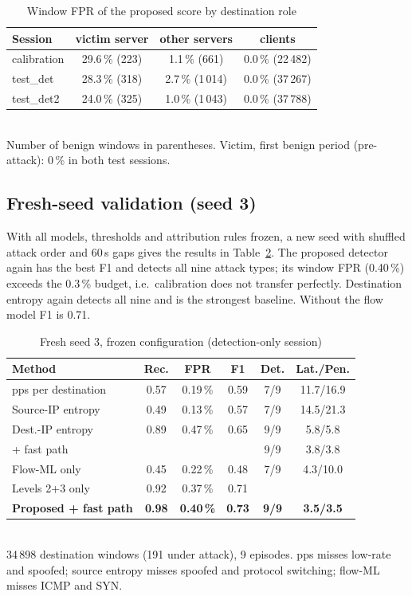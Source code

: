 \documentclass[conference]{IEEEtran}
\begin{document}
\begin{table}[t]
\caption{Window FPR of the proposed score by destination role}
\label{tab:role}
\centering
\setlength{\tabcolsep}{4pt}
\begin{tabular}{lccc}
\toprule
Session & victim server & other servers & clients \\
\midrule
calibration & 29.6\,\% (223) & 1.1\,\% (661) & 0.0\,\% (22\,482) \\
test\_det & 28.3\,\% (318) & 2.7\,\% (1\,014) & 0.0\,\% (37\,267) \\
test\_det2 & 24.0\,\% (325) & 1.0\,\% (1\,043) & 0.0\,\% (37\,788) \\
\bottomrule
\end{tabular}\\[2pt]
\footnotesize Number of benign windows in parentheses. Victim, first benign period (pre-attack): 0\,\% in both test sessions.
\end{table}

\subsection{Fresh-seed validation (seed 3)}\label{sec:seed3}
With all models, thresholds and attribution rules frozen, a new seed with shuffled attack order and 60\,s gaps gives the results in Table~\ref{tab:seed3}. The proposed detector again has the best F1 and detects all nine attack types; its window FPR (0.40\,\%) exceeds the 0.3\,\% budget, i.e.\ calibration does not transfer perfectly. Destination entropy again detects all nine and is the strongest baseline. Without the flow model F1 is 0.71.

\begin{table}[t]
\caption{Fresh seed 3, frozen configuration (detection-only session)}
\label{tab:seed3}
\centering
\setlength{\tabcolsep}{2.6pt}
\begin{tabular}{lccccc}
\toprule
Method & Rec. & FPR & F1 & Det. & Lat./Pen. \\
\midrule
pps per destination & 0.57 & 0.19\,\% & 0.59 & 7/9 & 11.7/16.9 \\
Source-IP entropy & 0.49 & 0.13\,\% & 0.57 & 7/9 & 14.5/21.3 \\
Dest.-IP entropy & 0.89 & 0.47\,\% & 0.65 & 9/9 & 5.8/5.8 \\
\quad + fast path & & & & 9/9 & 3.8/3.8 \\
Flow-ML only & 0.45 & 0.22\,\% & 0.48 & 7/9 & 4.3/10.0 \\
Levels 2+3 only & 0.92 & 0.37\,\% & 0.71 & & \\
\textbf{Proposed + fast path} & \textbf{0.98} & \textbf{0.40\,\%} & \textbf{0.73} & \textbf{9/9} & \textbf{3.5/3.5} \\
\bottomrule
\end{tabular}\\[2pt]
\footnotesize 34\,898 destination windows (191 under attack), 9 episodes. pps misses low-rate and spoofed; source entropy misses spoofed and protocol switching; flow-ML misses ICMP and SYN.
\end{table}
\end{document}
